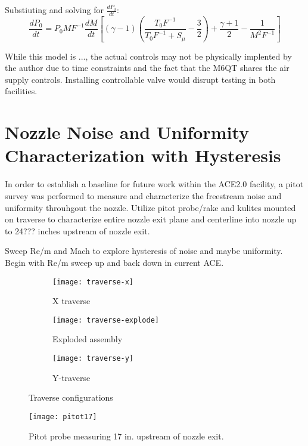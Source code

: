 Substiuting and solving for $\frac{dP_0}{dt}$:
\begin{equation}
    \frac{dP_0}{dt} = P_0 M F^{-1} \frac{dM}{dt} \left[ (\gamma-1) \left( \frac{T_0 F^{-1}}{T_0 F^{-1} + S_\mu} - \frac{3}{2} \right) + \frac{\gamma+1}{2} - \frac{1}{M^2 F^{-1}} \right]
\end{equation}

While this model is ..., the actual controls may not be physically implented by the author due to time constraints and the fact that the M6QT shares the air supply controls. Installing controllable valve would disrupt testing in both facilities.

\section{Nozzle Noise and Uniformity Characterization with Hysteresis}

In order to establish a baseline for future work within the ACE2.0 facility, a pitot survey was performed to measure and characterize the freestream noise and uniformity throuhgout the nozzle. Utilize pitot probe/rake and kulites mounted on traverse to characterize entire nozzle exit plane and centerline into nozzle up to 24??? inches upstream of nozzle exit.

Sweep Re/m and Mach to explore hysteresis of noise and maybe uniformity. Begin with Re/m sweep up and back down in current ACE.

\begin{figure}[ht]
    \centering
    \begin{subfigure}[b]{0.4\textwidth}
            \texttt{[image: traverse-x]}
        \caption{X traverse}
        \label{fig:traverse-x}
    \end{subfigure}
    \begin{subfigure}[b]{0.22\textwidth}
            \texttt{[image: traverse-explode]}
        \caption{Exploded assembly}
        \label{fig:traverse-explode}
    \end{subfigure}
    \begin{subfigure}[b]{0.35\textwidth}
            \texttt{[image: traverse-y]}
        \caption{Y-traverse}
        \label{fig:traverse-y}
    \end{subfigure}
    \caption{Traverse configurations}
    \label{fig:traverse}
\end{figure}

\begin{figure}[ht]
    \centering
    \texttt{[image: pitot17]}
    \caption{Pitot probe measuring 17 in. upstream of nozzle exit.}
    \label{fig:pitot17}
\end{figure}

